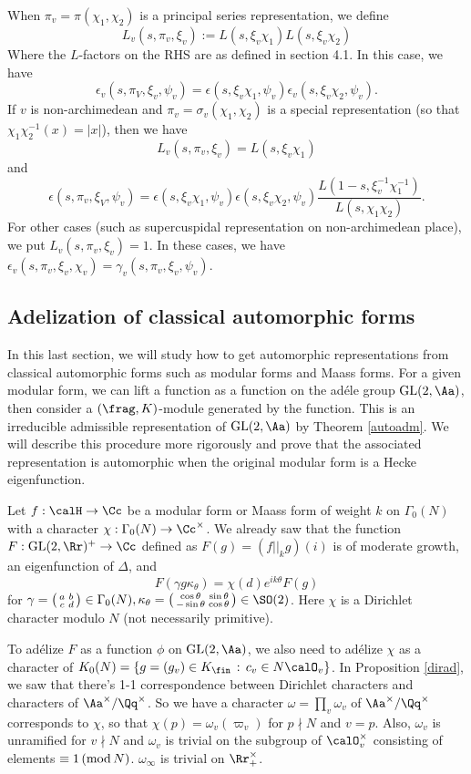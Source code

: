 When $\pi_v = \pi(\chi_1, \chi_2)$ is a principal series representation, we define 
$$
L_{v}(s, \pi_v, \xi_v) := L(s, \xi_v \chi_1)L(s, \xi_v\chi_2)
$$
Where the $L$-factors on the RHS are as defined in section 4.1. In this case, we have
$$
\epsilon_v(s, \pi_V, \xi_v, \psi_v) = \epsilon(s, \xi_v \chi_1, \psi_v) \epsilon_v(s, \xi_v \chi_2, \psi_v).
$$
If $v$ is non-archimedean and $\pi_v= \sigma_v(\chi_1, \chi_2)$ is a special representation (so that $\chi_1\chi_2^{-1}(x) = |x|$), then we have
$$
L_{v}(s, \pi_v, \xi_v) = L(s, \xi_v \chi_1)
$$
and
$$
\epsilon(s, \pi_v, \xi_V, \psi_v) = \epsilon(s, \xi_v \chi_1,\psi_v)\epsilon(s, \xi_v \chi_2, \psi_v) \frac{L(1-s, \xi_{v}^{-1}\chi_1^{-1})}{L(s, \chi_1\chi_2)}.
$$
For other cases (such as  supercuspidal representation on non-archimedean place), we put $L_{v}(s, \pi_v, \xi_v) = 1$. In these cases, we have $\epsilon_{v}(s, \pi_v, \xi_v, \chi_v) = \gamma_v(s, \pi_v, \xi_v, \psi_v)$. 





\subsection{Adelization of classical automorphic forms}

In this last section, we will study how to get automorphic representations from classical automorphic forms such as  modular forms and Maass forms. 
For a given modular form, we can lift a function as a function on the ad\'ele group $\GL(2, \Aa)$, then consider a $(\frag, K)$-module generated by the function. 
This is an irreducible admissible representation of $\GL(2, \Aa)$ by Theorem \ref{autoadm}. We will describe this procedure more rigorously and prove that the associated representation is automorphic when the original modular form is a Hecke eigenfunction. 

Let $f:\calH \to \Cc$ be a modular form or Maass form of weight $k$ on $\Gamma_0(N)$ with a character $\chi:\Gamma_0(N) \to \Cc^{\times}$. 
We already saw that the function $F:\GL(2, \Rr)^{+}\to \Cc$ defined as $F(g) = (f||_{k}g)(i)$ is of moderate growth, an eigenfunction of $\Delta$, and 
$$
F(\gamma g \kappa_\theta) = \chi(d) e^{ik\theta}F(g)
$$
for $\gamma = \smat{a}{b}{c}{d} \in \Gamma_{0}(N), \kappa_{\theta} = \smat{\cos \theta}{\sin \theta}{-\sin \theta}{\cos\theta} \in \SO(2)$. 
Here $\chi$ is a Dirichlet character modulo $N$ (not necessarily primitive). 

To ad\'elize $F$ as a function $\phi$ on $\GL(2, \Aa)$, we also need to ad\'elize $\chi$ as a character of $K_{0}(N) = \{g  = (g_{v}) \in K_{\fin}\,:\, c_{v}\in N\calO_{v}\}$. 
In Proposition \ref{dirad}, we saw that there's 1-1 correspondence between Dirichlet characters and characters of $\Aa^{\times}/\Qq^{\times}$. 
So we have a character $\omega = \prod_{v} \omega_{v}$ of $\Aa^{\times}/\Qq^{\times}$ corresponds to $\chi$, so that $\chi(p) = \omega_{v}(\varpi_{v})$ for $p\nmid N$ and $v = p$. 
Also, $\omega_{v}$ is unramified for $v\nmid N$ and $\omega_{v}$ is trivial on the subgroup of $\calO_{v}^{\times}$ consisting of elements $\equiv 1\,(\mathrm{mod}\,N)$. 
$\omega_{\infty}$ is trivial on $\Rr_{+}^{\times}$. 

